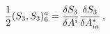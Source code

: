 \begin{equation*}
\frac{1}{2}(S_{3},S_{3})_{6}^{a}=\frac{\delta S_{3}}{\delta A^{i}}\frac{%
\delta S_{3}}{\delta A_{ia}^{\ast }}\,,
\end{equation*}

